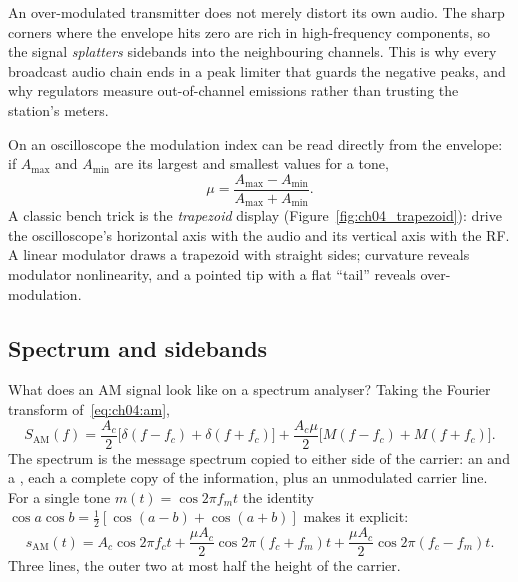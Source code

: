 
\begin{pitfall}
An over-modulated transmitter does not merely distort its own audio. The sharp corners where the
envelope hits zero are rich in high-frequency components, so the signal \emph{splatters} sidebands into
the neighbouring channels. This is why every broadcast audio chain ends in a peak limiter that guards the
negative peaks, and why regulators measure out-of-channel emissions rather than trusting the station's
meters.
\end{pitfall}

On an oscilloscope the modulation index can be read directly from the envelope: if $A_{\max}$ and
$A_{\min}$ are its largest and smallest values for a tone,
\begin{equation}
\mu=\frac{A_{\max}-A_{\min}}{A_{\max}+A_{\min}}.
\label{eq:ch04:muscope}
\end{equation}
A classic bench trick is the \emph{trapezoid} display (Figure~\ref{fig:ch04_trapezoid}): drive the
oscilloscope's horizontal axis with the audio and its vertical axis with the RF. A linear modulator
draws a trapezoid with straight sides; curvature reveals modulator nonlinearity, and a pointed tip with
a flat ``tail'' reveals over-modulation.


\subsection{Spectrum and sidebands}

What does an AM signal look like on a spectrum analyser? Taking the Fourier transform
of~\eqref{eq:ch04:am},
\begin{equation}
S_{\text{AM}}(f)=\frac{A_c}{2}\big[\delta(f-f_c)+\delta(f+f_c)\big]
+\frac{A_c\mu}{2}\big[M(f-f_c)+M(f+f_c)\big].
\label{eq:ch04:amspec}
\end{equation}
The spectrum is the message spectrum copied to either side of the carrier: an 
and a , each a complete copy of the information, plus an unmodulated carrier line.
For a single tone $m(t)=\cos2\pi f_m t$ the identity $\cos a\cos b=\frac12[\cos(a-b)+\cos(a+b)]$ makes
it explicit:
\begin{equation}
s_{\text{AM}}(t)=A_c\cos2\pi f_ct+\frac{\mu A_c}{2}\cos2\pi(f_c+f_m)t+\frac{\mu A_c}{2}\cos2\pi(f_c-f_m)t.
\end{equation}
Three lines, the outer two at most half the height of the carrier.

